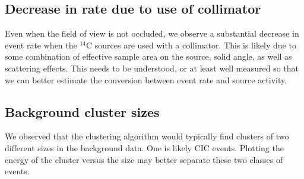 \documentclass[11pt]{article}
\newcommand{\nuc}[2]{\ensuremath{^{#1}}#2}
\begin{document}
\subsection{Decrease in rate due to use of collimator}
Even when the field of view is not occluded, we observe a substantial decrease in event rate when the \nuc{14}{C} sources are used with a collimator. This is likely due to some combination of 
effective sample area on the source, solid angle, as well as scattering effects. This needs to be understood, or at least well measured so that we can better estimate the conversion between event rate and source activity.

\subsection{Background cluster sizes}
We observed that the clustering algorithm would typically find clusters of two different sizes in the background data. One is likely CIC events. Plotting the energy of the cluster versus the size may better separate these two classes of events. 
\end{document}
